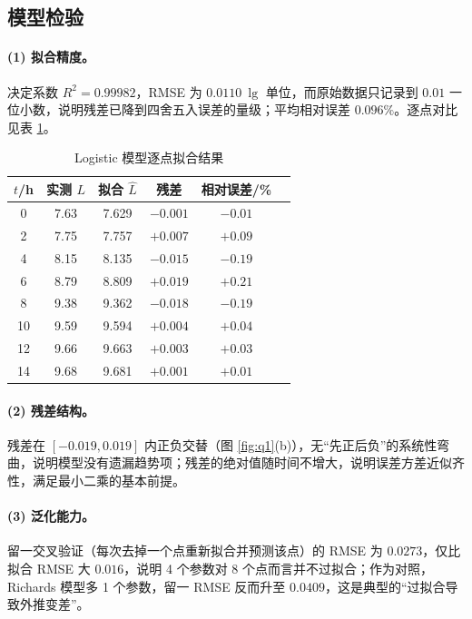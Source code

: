 \subsection{模型检验}

\paragraph{(1) 拟合精度。}决定系数 $R^2=0.99982$，RMSE 为 $0.0110\ \lg$ 单位，而原始数据只记录到 $0.01$ 一位小数，说明残差已降到四舍五入误差的量级；平均相对误差 $0.096\%$。逐点对比见表 \ref{tab:q1point}。

\begin{table}[H]
\centering
\caption{Logistic 模型逐点拟合结果}
\label{tab:q1point}
\small
\begin{tabular}{cccccc}
\toprule
$t$/h & 实测 $L$ & 拟合 $\hat L$ & 残差 & 相对误差/\% \\
\midrule
0  & 7.63 & 7.629 & $-0.001$ & $-0.01$ \\
2  & 7.75 & 7.757 & $+0.007$ & $+0.09$ \\
4  & 8.15 & 8.135 & $-0.015$ & $-0.19$ \\
6  & 8.79 & 8.809 & $+0.019$ & $+0.21$ \\
8  & 9.38 & 9.362 & $-0.018$ & $-0.19$ \\
10 & 9.59 & 9.594 & $+0.004$ & $+0.04$ \\
12 & 9.66 & 9.663 & $+0.003$ & $+0.03$ \\
14 & 9.68 & 9.681 & $+0.001$ & $+0.01$ \\
\bottomrule
\end{tabular}
\end{table}

\paragraph{(2) 残差结构。}残差在 $[-0.019,0.019]$ 内正负交替（图 \ref{fig:q1}(b)），无“先正后负”的系统性弯曲，说明模型没有遗漏趋势项；残差的绝对值随时间不增大，说明误差方差近似齐性，满足最小二乘的基本前提。

\paragraph{(3) 泛化能力。}留一交叉验证（每次去掉一个点重新拟合并预测该点）的 RMSE 为 $0.0273$，仅比拟合 RMSE 大 $0.016$，说明 4 个参数对 8 个点而言并不过拟合；作为对照，Richards 模型多 1 个参数，留一 RMSE 反而升至 $0.0409$，这是典型的“过拟合导致外推变差”。

